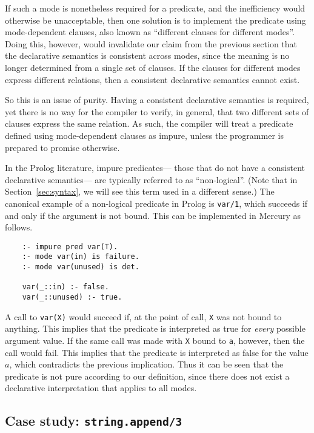 If such a mode is nonetheless required for a predicate,
and the inefficiency would otherwise be unacceptable,
then one solution is to implement the predicate
using mode-dependent clauses,
also known as ``different clauses for different modes''.
Doing this, however,
would invalidate our claim from the previous section
that the declarative semantics is consistent across modes,
since the meaning is no longer determined from a single set of clauses.
If the clauses for different modes express different relations,
then a consistent declarative semantics cannot exist.

So this is an issue of purity.
Having a consistent declarative semantics is required,
yet there is no way for the compiler to verify, in general,
that two different sets of clauses express the same relation.
As such,
the compiler will treat a predicate
defined using mode-dependent clauses as impure,
unless the programmer is prepared to promise otherwise.

In the Prolog literature, impure predicates---%
those that do not have a consistent declarative semantics---%
are typically referred to as ``non-logical\label{gi:non-logical}''.
(Note that in Section~\ref{sec:syntax},
we will see this term used in a different sense.)
The canonical example of a non-logical predicate in Prolog
is \texttt{var/1},
which succeeds if and only if the argument is not bound.
This can be implemented in Mercury as follows.
\begin{verbatim}
    :- impure pred var(T).
    :- mode var(in) is failure.
    :- mode var(unused) is det.

    var(_::in) :- false.
    var(_::unused) :- true.
\end{verbatim}
A call to \texttt{var(X)} would succeed if,
at the point of call,
\texttt{X} was not bound to anything.
This implies that the predicate is interpreted as true
for \emph{every} possible argument value.
If the same call was made with \texttt{X} bound to \texttt{a},
however, then the call would fail.
This implies that the predicate is interpreted as false
for the value $a$,
which contradicts the previous implication.
Thus it can be seen that the predicate is not pure
according to our definition,
since there does not exist a declarative interpretation
that applies to all modes.


\subsection{Case study: \texttt{string.append/3}}
\label{sec:purity-example}


